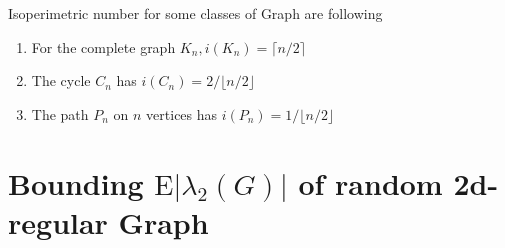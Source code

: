 \documentclass[oneside]{book}
\begin{document}
	
	
	
	Isoperimetric number for some classes of Graph are following \par
	\begin{enumerate}
		\item   For the complete graph $K_{n}, i\left(K_{n}\right)=\lceil n / 2\rceil$ \par
		\item The cycle $C_{n}$ has $i\left(C_{n}\right)=2 /\lfloor n / 2\rfloor$ \par
		\item  The path $P_{n}$ on $n$ vertices has $i\left(P_{n}\right)=1 /\lfloor n / 2\rfloor$
	\end{enumerate}
	\section{Bounding $\mathrm{E}\left|\lambda_{2}(G)\right|$ of random 2d-regular Graph}
	\label{s:6 }
	
\end{document}
